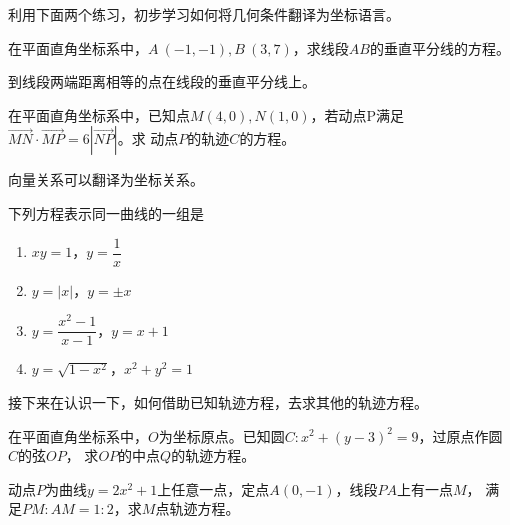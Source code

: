 利用下面两个练习，初步学习如何将几何条件翻译为坐标语言。
\begin{exercise}
    在平面直角坐标系中，\(A\ (-1,-1),B\ (3,7)\)，求线段\(AB\)的垂直平分线的方程。
\end{exercise}
\begin{hint}
    到线段两端距离相等的点在线段的垂直平分线上。
\end{hint}
\begin{exercise}
    在平面直角坐标系中，已知点$M(4,0),N(1,0)$，若动点P满足$\overrightarrow{MN}\cdot\overrightarrow{MP}=6|\overrightarrow{NP}|$。求
动点$P$的轨迹$C$的方程。
\end{exercise}
\begin{hint}
    向量关系可以翻译为坐标关系。
\end{hint}
\begin{exercise}
    下列方程表示同一曲线的一组是
    \begin{enumerate}
        \setlength{\itemsep}{-\itemsep}
        \item \(xy=1\)，\(y=\dfrac{1}{x}\)
        \item \(y=|x|\)，\(y=\pm x\)
        \item \(y=\dfrac{x^2-1}{x-1}\)，\(y=x+1\)
        \item \(y=\sqrt{1-x^2}\)，\(x^2+y^2=1\)
    \end{enumerate}
\end{exercise}

接下来在认识一下，如何借助已知轨迹方程，去求其他的轨迹方程。
\begin{example}在平面直角坐标系中，\(O\)为坐标原点。已知圆$C:x^2+(y-3)^2=9$，过原点作圆$C$的弦$OP$，
求$OP$的中点$Q$的轨迹方程。
\end{example}
\begin{jie}

\end{jie}
\begin{exercise}
    动点\(P\)为曲线\(y=2x^2+1\)上任意一点，定点\(A(0,-1)\)，线段\(PA\)上有一点\(M\)，
    满足\(PM:AM=1:2\)，求\(M\)点轨迹方程。
\end{exercise}

